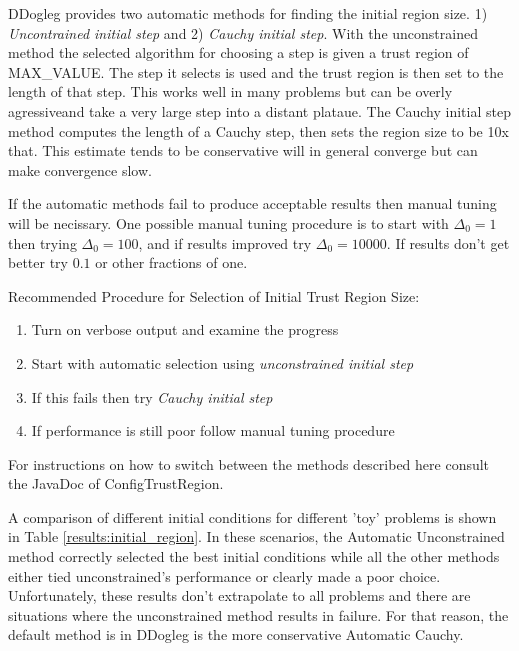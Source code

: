 \documentclass[peerreview,compsoc,onecolumn]{IEEEtran}
\newenvironment{enumargin}[1]{\begin{enumerate}[leftmargin=#1\textwidth , rightmargin=#1\textwidth]}{\end{enumerate}}
\begin{document}
DDogleg provides two automatic methods for finding the initial region size. 1) \emph{Uncontrained initial step} and 2) \emph{Cauchy initial step}. With the unconstrained method the selected algorithm for choosing a step is given a trust region of MAX\_VALUE. The step it selects is used and the trust region is then set to the length of that step. This works well in many problems but can be overly agressiveand take a very large step into a distant plataue. The Cauchy initial step method computes the length of a Cauchy step, then sets the region size to be 10x that. This estimate tends to be conservative will in general converge but can make convergence slow.

If the automatic methods fail to produce acceptable results then manual tuning will be necissary. One possible manual tuning procedure is to start with $\Delta_0=1$ then trying $\Delta_0=100$, and if results improved try $\Delta_0=10000$. If results don't get better try $0.1$ or other fractions of one.

Recommended Procedure for Selection of Initial Trust Region Size:
\begin{enumargin}{0.2}
\item Turn on verbose output and examine the progress
\item Start with automatic selection using \emph{unconstrained initial step}
\item If this fails then try \emph{Cauchy initial step}
\item If performance is still poor follow manual tuning procedure
\end{enumargin}
For instructions on how to switch between the methods described here consult the JavaDoc of ConfigTrustRegion.

A comparison of different initial conditions for different 'toy' problems is shown in Table \ref{results:initial_region}. In these scenarios, the Automatic Unconstrained method correctly selected the best initial conditions while all the other methods either tied unconstrained's performance or clearly made a poor choice. Unfortunately, these results don't extrapolate to all problems and there are situations where the unconstrained method results in failure. For that reason, the default method is in DDogleg is the more conservative Automatic Cauchy.
\end{document}
